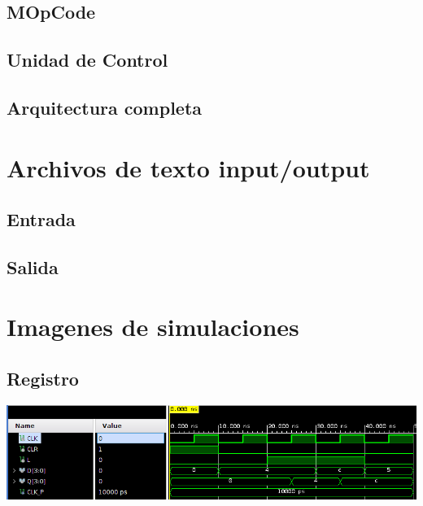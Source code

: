 \documentclass[8pt,executivepaper]{article}
\begin{document}
\subsection{MOpCode}
\begin{center}
  
\end{center}
\subsection{Unidad de Control}
\begin{center}
  
\end{center}
\subsection{Arquitectura completa}
\begin{center}
  
\end{center}

\section{Archivos de texto input/output}
\subsection{Entrada}
\begin{center}
  
\end{center}
\subsection{Salida}
\begin{center}
  
\end{center}

\section{Imagenes de simulaciones}
\subsection{Registro}
\begin{center}
  \includegraphics[scale=0.5]{img/registro.png}
\end{center}
\end{document}
